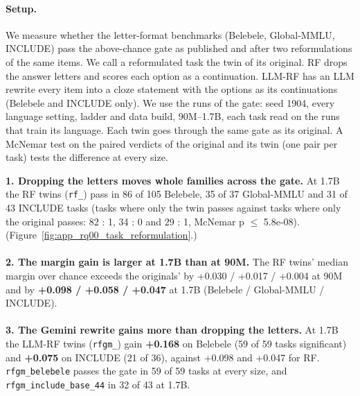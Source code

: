 {\begin{minipage}[t]{0.485\textwidth}
\paragraph{Setup.} We measure whether the letter-format benchmarks (Belebele, Global-MMLU, INCLUDE) pass the above-chance gate as published and after two reformulations of the same items. We call a reformulated task the twin of its original. RF drops the answer letters and scores each option as a continuation. LLM-RF has an LLM rewrite every item into a cloze statement with the options as its continuations (Belebele and INCLUDE only). We use the runs of the gate: seed 1904, every language setting, ladder and data build, 90M--1.7B, each task read on the runs that train its language. Each twin goes through the same gate as its original. A McNemar test on the paired verdicts of the original and its twin (one pair per task) tests the difference at every size.
\end{minipage}\hfill
\begin{minipage}[t]{0.485\textwidth}
\vspace{0pt}
\begin{rqfinding}
\textbf{1. Dropping the letters moves whole families across the gate.} At 1.7B the RF twins (\texttt{rf\_}) pass in 86 of 105 Belebele, 35 of 37 Global-MMLU and 31 of 43 INCLUDE tasks (tasks where only the twin passes against tasks where only the original passes: 82 : 1, 34 : 0 and 29 : 1, McNemar p $\leq$ 5.8e-08). (Figure~\ref{fig:app_rq00_task_reformulation}.)
\\
\\
\textbf{2. The margin gain is larger at 1.7B than at 90M.} The RF twins' median margin over chance exceeds the originals' by +0.030 / +0.017 / +0.004 at 90M and by \textbf{+0.098 / +0.058 / +0.047} at 1.7B (Belebele / Global-MMLU / INCLUDE).
\\
\\
\textbf{3. The Gemini rewrite gains more than dropping the letters.} At 1.7B the LLM-RF twins (\texttt{rfgm\_}) gain \textbf{+0.168} on Belebele (59 of 59 tasks significant) and \textbf{+0.075} on INCLUDE (21 of 36), against +0.098 and +0.047 for RF. \texttt{rfgm\_belebele} passes the gate in 59 of 59 tasks at every size, and \texttt{rfgm\_include\_base\_44} in 32 of 43 at 1.7B.
\end{rqfinding}
\end{minipage}

}
